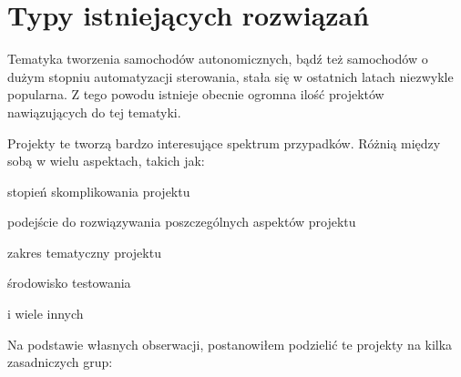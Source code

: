 \section{Typy istniejących rozwiązań}
Tematyka tworzenia samochodów autonomicznych, bądź też samochodów o dużym stopniu automatyzacji sterowania, stała się w ostatnich latach niezwykle popularna. Z tego powodu istnieje obecnie ogromna ilość projektów nawiązujących do tej tematyki.

Projekty te tworzą bardzo interesujące spektrum przypadków. Różnią między sobą w wielu aspektach, takich jak:
\begin{itemize*}
\item stopień skomplikowania projektu
\item podejście do rozwiązywania poszczególnych aspektów projektu
\item zakres tematyczny projektu
\item środowisko testowania
\item i wiele innych
\end{itemize*}

Na podstawie własnych obserwacji, postanowiłem podzielić te projekty na kilka zasadniczych grup:

